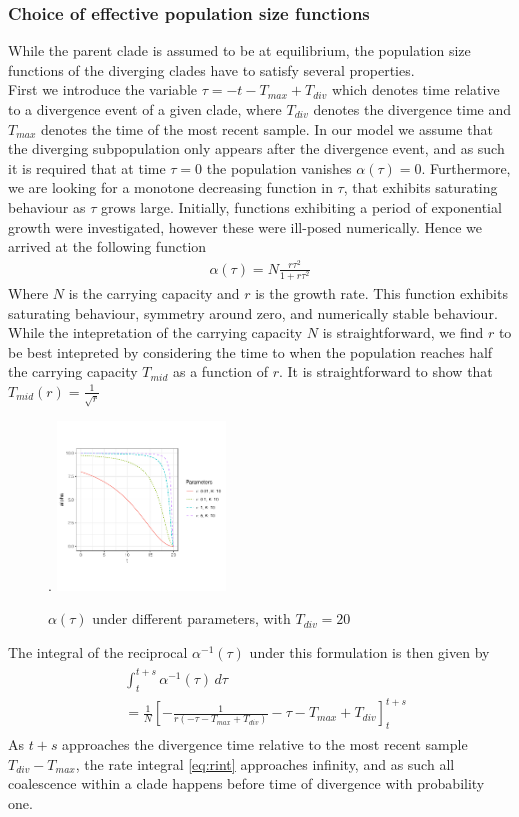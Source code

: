 \documentclass{report}
\theoremstyle{definition}
\begin{document}
\subsubsection{Choice of effective population size functions}
While the parent clade is assumed to be at equilibrium, the population size functions of the diverging clades have to satisfy several properties.\\
First we introduce the variable $\tau = -t - T_{max} + T_{div}$ which denotes time relative to a divergence event of a given clade, where $T_{div}$ denotes the divergence time and $T_{max}$ denotes the time of the most recent sample.
In our model we assume that the diverging subpopulation only appears after the divergence event, and as such it is required that at time $\tau=0$ the population vanishes $\alpha(\tau)=0$. Furthermore, we are looking for a monotone decreasing function in $\tau$, that exhibits saturating behaviour as $\tau$ grows large.
Initially, functions exhibiting a period of exponential growth were investigated, however these were ill-posed numerically.
Hence we arrived at the following function
\begin{gather}
\alpha(\tau) = N\frac{r\tau^2}{1+r\tau^2}
\end{gather} 
Where $N$ is the carrying capacity and $r$ is the growth rate.
This function  exhibits saturating behaviour, symmetry around zero, and numerically stable behaviour.\\
While the intepretation of the carrying capacity $N$ is straightforward, we find $r$ to be best intepreted by considering the time to when the population reaches half the carrying capacity $T_{mid}$ as a function of $r$. It is straightforward to show that $T_{mid}(r) = \frac{1}{\sqrt{r}}$ 
\begin{figure}[H].
  \centering
     \includegraphics[width=0.4\textwidth]{../R/test_mcmc/alpha_plots}
    \caption{$\alpha(\tau)$ under different parameters, with $T_{div}=20$}
\end{figure}
The integral of the reciprocal $\alpha^{-1}(\tau)$ under this formulation is then given by 
\begin{gather}
\begin{aligned}\label{eq:rint}
&\int_{t}^{t+s}\alpha^{-1}(\tau)\,d\tau\\ &= \frac{1}{N}\left[-\frac{1}{r(-\tau-T_{max}+T_{div})}-\tau-T_{max}+T_{div}\right]_{t}^{t+s}
\end{aligned}
\end{gather}
As $t+s$ approaches the divergence time relative to the most recent sample $T_{div} - T_{max}$, the rate integral \ref{eq:rint} approaches infinity, and as such all coalescence within a clade happens before time of divergence with probability one.
\end{document}
